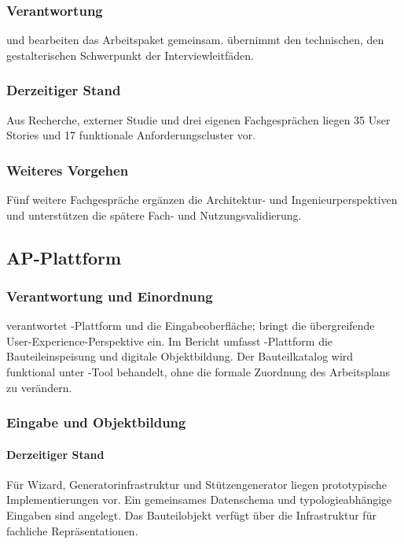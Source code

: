 \documentclass[type=zwischenbericht]{zukunftbau}
\begin{document}
\subsubsection{Verantwortung}
 und  bearbeiten das Arbeitspaket gemeinsam.  übernimmt den technischen,  den gestalterischen Schwerpunkt der Interviewleitfäden.

\subsubsection{Derzeitiger Stand}
Aus Recherche, externer Studie und drei eigenen Fachgesprächen liegen 35 User Stories und 17 funktionale Anforderungscluster vor.

\subsubsection{Weiteres Vorgehen}
Fünf weitere Fachgespräche ergänzen die Architektur- und Ingenieurperspektiven und unterstützen die spätere Fach- und Nutzungsvalidierung.

\subsection{AP-Plattform}

\subsubsection{Verantwortung und Einordnung}
 verantwortet -Plattform und die Eingabeoberfläche;  bringt die übergreifende User-Experience-Perspektive ein. Im Bericht umfasst -Plattform die Bauteileinspeisung und digitale Objektbildung. Der Bauteilkatalog wird funktional unter -Tool behandelt, ohne die formale Zuordnung des Arbeitsplans zu verändern.

\subsubsection{Eingabe und Objektbildung}

\paragraph{Derzeitiger Stand}
Für Wizard, Generatorinfrastruktur und Stützengenerator liegen prototypische Implementierungen vor. Ein gemeinsames Datenschema und typologieabhängige Eingaben sind angelegt. Das Bauteilobjekt verfügt über die Infrastruktur für fachliche Repräsentationen.
\end{document}
